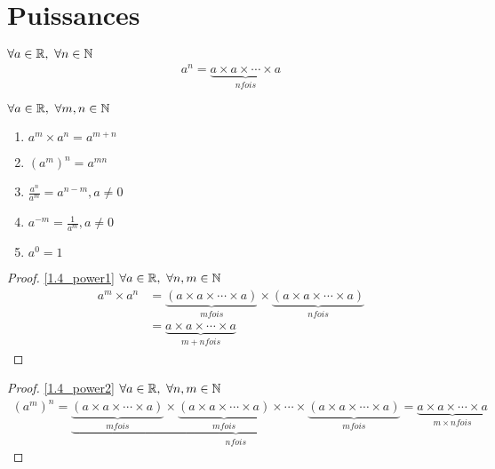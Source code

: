 \section{Puissances}

\begin{graybox}
	\begin{definition}
		$\forall a \in \mathbb{R},\ \forall n \in \mathbb{N}$
		\begin{align*}
			a^n = \underbrace{a \times a \times \cdots \times a}_{n fois}	
		\end{align*}
	\end{definition}
\end{graybox}

\begin{graybox}
	\begin{proposition}
		$\forall a \in \mathbb{R},\ \forall m, n \in \mathbb{N}$
		\begin{enumerate}
			\item \label{1.4_power1} $a^m \times a^n = a^{m + n}$
			\item \label{1.4_power2} $(a^m)^n = a^{mn}$
			\item \label{1.4_power3} $\displaystyle{\frac{a^n}{a^m}} = a^{n - m}, a \neq 0$
			\item \label{1.4_power4} $a^{-m} = \displaystyle{\frac{1}{a^m}}, a \neq 0$
			\item \label{1.4_power5} $a^0 = 1$
		\end{enumerate}
	\end{proposition}
\end{graybox}

\begin{proof}
	\ref{1.4_power1} $\forall a \in \mathbb{R},\ \forall n, m \in \mathbb{N}$
	\begin{align*}
		a^m \times a^n &= \underbrace{(a \times a \times \cdots \times a)}_{m fois} \times \underbrace{(a \times a \times \cdots \times a)}_{n fois} \\
		&= \underbrace{a \times a \times \cdots \times a}_{m + n fois}
	\end{align*}
\end{proof}

\begin{proof}
	\ref{1.4_power2} $\forall a \in \mathbb{R},\ \forall n, m \in \mathbb{N}$
	\begin{align*}
		(a^m)^n = \underbrace{\underbrace{(a \times a \times \cdots \times a)}_{m fois} \times \underbrace{(a \times a \times \cdots \times a)}_{m fois} \times \cdots \times \underbrace{(a \times a \times \cdots \times a)}_{m fois}}_{n fois} = \underbrace{a \times a \times \cdots \times a}_{m \times n fois}
	\end{align*}
\end{proof}

